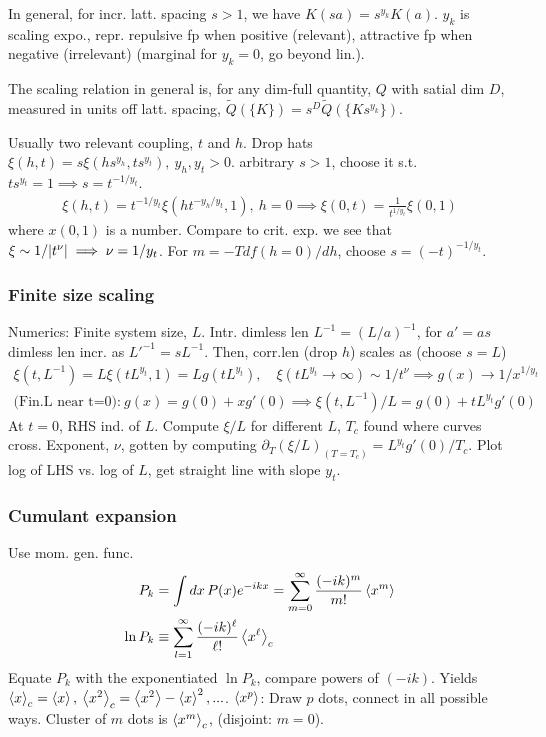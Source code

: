 \documentclass[a4paper, english, 12pt]{article}
\newcommand{\curly}[1]{\{ #1 \} }
\begin{document}
\begin{multicols*}{2}
In general, for incr. latt. spacing $s>1$, we have $K(sa)=s^{y_k} K(a)$. $y_k$ is scaling expo., repr. repulsive fp when positive (relevant), attractive fp when negative (irrelevant) (marginal for $y_k=0$, go beyond lin.). 

The scaling relation in general is, for any dim-full quantity, $Q$ with satial dim $D$, measured in units off latt. spacing, $\boxed{\tilde{Q}(\curly{K})=s^D \tilde{Q}(\curly{K s^{y_k}})}$.

Usually two relevant coupling, $t$ and $h$. Drop hats $\xi(h,t) = s \xi(hs^{y_h},ts^{y_t}),\:y_h,y_t>0$. arbitrary $s>1$, choose it s.t. $ts^{y_t}=1\implies s=t^{-1/y_t}$. 
\begin{align*}
    \xi(h,t) = t^{-1/y_t} \xi(ht^{-y_h / y_t},1),\:h=0\implies \xi(0,t) = \frac{1}{t^{1/y_t}} \xi(0,1)
\end{align*}
where $x(0,1)$ is a number. Compare to crit. exp. we see that $\xi\sim 1/\abs{t^\nu}\implies \nu=1/y_t$. For $m=-T df(h=0)/dh$, choose $s=(-t)^{-1/y_t}$. 

\subsubsection*{\tiny Finite size scaling}
Numerics: Finite system size, $L$. Intr. dimless len $L^{-1}=(L/a)^{-1}$, for $a'=as$ dimless len incr. as $L'^{-1}=sL^{-1}$. Then, corr.len (drop $h$) scales as (choose $s=L$)
\begin{align*}
    \xi(t,L^{-1}) = L \xi(t L^{y_t},1)=L g(tL^{y_t}),\quad \xi(tL^{y_t}\to\infty)\sim 1/t^\nu \implies g(x)\to 1/x^{1/y_t} \\
    \text{(Fin.L near t=0):}\: g(x)=g(0)+x g'(0) \implies \xi(t,L^{-1})/L = g(0) + tL^{y_t} g'(0)
\end{align*}  
At $t=0$, RHS ind. of $L$. Compute $\xi/L$ for different $L$, $T_c$ found where curves cross. Exponent, $\nu$, gotten by computing $\partial_T(\xi/L)_{(T=T_c)}=L^{y_t}g'(0)/T_c$. Plot log of LHS vs. log of $L$, get straight line with slope $y_t$. 

\subsubsection*{\scriptsize Cumulant expansion}

Use mom. gen. func. 
\begin{align*}
    P_k&=\int dx\, P(x)e^{-ikx} = \sum_{m=0}^\infty \frac{(-ik)^m}{m!}\expval{x^m} \\
    \ln P_k &\equiv \sum_{l=1}^\infty \frac{(-ik)^\ell}{\ell!} \expval{x^\ell}_c
\end{align*}
Equate $P_k$ with the exponentiated $\ln P_k$, compare powers of $(-ik)$. Yields $\expval{x}_c=\expval{x},\:\expval{x^2}_c=\expval{x^2}-\expval{x}^2,...$. $\expval{x^p}$: Draw $p$ dots, connect in all possible ways. Cluster of $m$ dots is $\expval{x^m}_c$, (disjoint: $m=0$). 


\end{multicols*}
\end{document}
